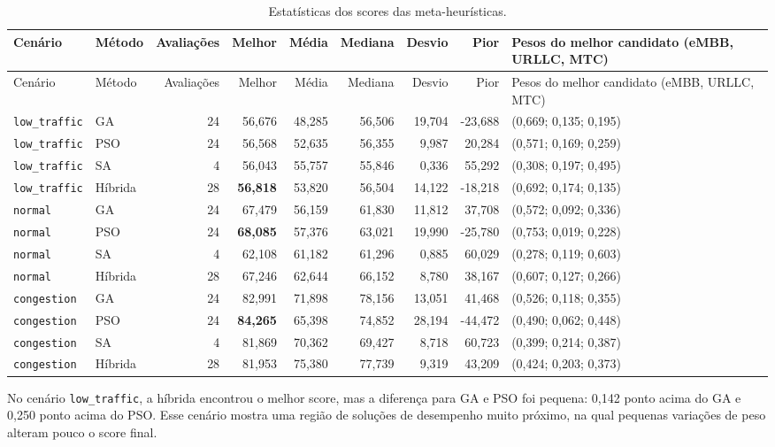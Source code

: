 \documentclass[12pt,a4paper]{article}
\begin{document}
\begin{landscape}
\scriptsize
\begin{longtable}{llrrrrrrl}
\caption{Estatísticas dos scores das meta-heurísticas.}\label{tab:metaheuristicas}\\
\toprule
Cenário & Método & Avaliações & Melhor & Média & Mediana & Desvio & Pior & Pesos do melhor candidato (eMBB, URLLC, MTC) \\
\midrule
\endfirsthead
\toprule
Cenário & Método & Avaliações & Melhor & Média & Mediana & Desvio & Pior & Pesos do melhor candidato (eMBB, URLLC, MTC) \\
\midrule
\endhead
\texttt{low\_traffic} & GA & 24 & 56,676 & 48,285 & 56,506 & 19,704 & -23,688 & (0,669; 0,135; 0,195) \\
\texttt{low\_traffic} & PSO & 24 & 56,568 & 52,635 & 56,355 & 9,987 & 20,284 & (0,571; 0,169; 0,259) \\
\texttt{low\_traffic} & SA & 4 & 56,043 & 55,757 & 55,846 & 0,336 & 55,292 & (0,308; 0,197; 0,495) \\
\texttt{low\_traffic} & Híbrida & 28 & \textbf{56,818} & 53,820 & 56,504 & 14,122 & -18,218 & (0,692; 0,174; 0,135) \\
\texttt{normal} & GA & 24 & 67,479 & 56,159 & 61,830 & 11,812 & 37,708 & (0,572; 0,092; 0,336) \\
\texttt{normal} & PSO & 24 & \textbf{68,085} & 57,376 & 63,021 & 19,990 & -25,780 & (0,753; 0,019; 0,228) \\
\texttt{normal} & SA & 4 & 62,108 & 61,182 & 61,296 & 0,885 & 60,029 & (0,278; 0,119; 0,603) \\
\texttt{normal} & Híbrida & 28 & 67,246 & 62,644 & 66,152 & 8,780 & 38,167 & (0,607; 0,127; 0,266) \\
\texttt{congestion} & GA & 24 & 82,991 & 71,898 & 78,156 & 13,051 & 41,468 & (0,526; 0,118; 0,355) \\
\texttt{congestion} & PSO & 24 & \textbf{84,265} & 65,398 & 74,852 & 28,194 & -44,472 & (0,490; 0,062; 0,448) \\
\texttt{congestion} & SA & 4 & 81,869 & 70,362 & 69,427 & 8,718 & 60,723 & (0,399; 0,214; 0,387) \\
\texttt{congestion} & Híbrida & 28 & 81,953 & 75,380 & 77,739 & 9,319 & 43,209 & (0,424; 0,203; 0,373) \\
\bottomrule
\end{longtable}
\end{landscape}

No cenário \texttt{low\_traffic}, a híbrida encontrou o melhor score, mas a diferença para GA e PSO foi pequena: 0,142 ponto acima do GA e 0,250 ponto acima do PSO. Esse cenário mostra uma região de soluções de desempenho muito próximo, na qual pequenas variações de peso alteram pouco o score final.
\end{document}

